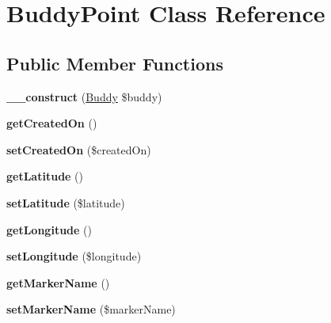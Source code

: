\hypertarget{class_buddy_point}{\section{Buddy\+Point Class Reference}
\label{class_buddy_point}
}
\subsection*{Public Member Functions}
\begin{DoxyCompactItemize}
\item 
\hypertarget{class_buddy_point_a7289c4f64d78a006e5de681a1f9bb97c}{{\bfseries \+\_\+\+\_\+construct} (\hyperlink{class_buddy}{Buddy} \$buddy)}\label{class_buddy_point_a7289c4f64d78a006e5de681a1f9bb97c}

\item 
\hypertarget{class_buddy_point_a346b90b05b25684ab3d2c62566270551}{{\bfseries get\+Created\+On} ()}\label{class_buddy_point_a346b90b05b25684ab3d2c62566270551}

\item 
\hypertarget{class_buddy_point_adff89ef96f7c1e0f0752caca8ccc750b}{{\bfseries set\+Created\+On} (\$created\+On)}\label{class_buddy_point_adff89ef96f7c1e0f0752caca8ccc750b}

\item 
\hypertarget{class_buddy_point_ada96fc6a273160f91e3cf4ef59efbe9a}{{\bfseries get\+Latitude} ()}\label{class_buddy_point_ada96fc6a273160f91e3cf4ef59efbe9a}

\item 
\hypertarget{class_buddy_point_acfbaf8d88bf4a5d9c51dad226294173d}{{\bfseries set\+Latitude} (\$latitude)}\label{class_buddy_point_acfbaf8d88bf4a5d9c51dad226294173d}

\item 
\hypertarget{class_buddy_point_acaa3304699a7de6311b199939e00eaf3}{{\bfseries get\+Longitude} ()}\label{class_buddy_point_acaa3304699a7de6311b199939e00eaf3}

\item 
\hypertarget{class_buddy_point_afe7764c449d74a458f31ea00c4f236ad}{{\bfseries set\+Longitude} (\$longitude)}\label{class_buddy_point_afe7764c449d74a458f31ea00c4f236ad}

\item 
\hypertarget{class_buddy_point_a7d24c6abfc3ae4e4c815c3e1dba2153b}{{\bfseries get\+Marker\+Name} ()}\label{class_buddy_point_a7d24c6abfc3ae4e4c815c3e1dba2153b}

\item 
\hypertarget{class_buddy_point_a9dd8c9303ddd32da9cdc18be0a885f32}{{\bfseries set\+Marker\+Name} (\$marker\+Name)}\label{class_buddy_point_a9dd8c9303ddd32da9cdc18be0a885f32}


\end{DoxyCompactItemize}
